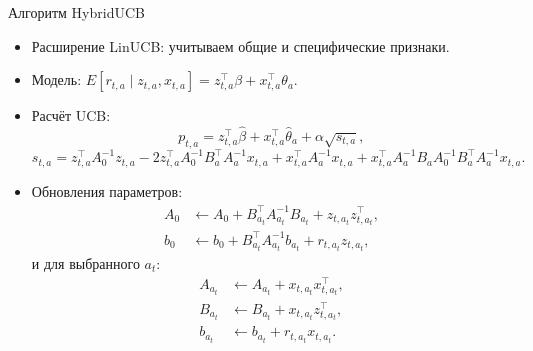 \documentclass[10pt]{beamer}
\begin{document}
\begin{frame}{Алгоритм HybridUCB}
  \begin{itemize}
    \item Расширение LinUCB: учитываем общие и специфические признаки.
    \item Модель: $E[r_{t,a}\mid z_{t,a},x_{t,a}] = z_{t,a}^\top\beta + x_{t,a}^\top\theta_a$.
    \item Расчёт UCB: 
    \[ p_{t,a} = z_{t,a}^\top\hat{\beta} + x_{t,a}^\top\hat{\theta}_a + \alpha\sqrt{s_{t,a}}, \]
    \[ s_{t,a} = z_{t,a}^\top A_0^{-1}z_{t,a} - 2z_{t,a}^\top A_0^{-1}B_a^\top A_a^{-1}x_{t,a} + x_{t,a}^\top A_a^{-1}x_{t,a} + x_{t,a}^\top A_a^{-1} B_a A_0^{-1} B_a^\top A_a^{-1} x_{t,a}. \]
    \item Обновления параметров:
    \begin{align*}
      A_0 &\leftarrow A_0 + B_{a_t}^\top A_{a_t}^{-1} B_{a_t} + z_{t,a_t}z_{t,a_t}^\top, \\
      b_0 &\leftarrow b_0 + B_{a_t}^\top A_{a_t}^{-1} b_{a_t} + r_{t,a_t}z_{t,a_t},
    \end{align*}
    и для выбранного $a_t$:
    \begin{align*}
      A_{a_t} &\leftarrow A_{a_t} + x_{t,a_t}x_{t,a_t}^\top, \\
      B_{a_t} &\leftarrow B_{a_t} + x_{t,a_t}z_{t,a_t}^\top, \\
      b_{a_t} &\leftarrow b_{a_t} + r_{t,a_t}x_{t,a_t}.
    \end{align*}
  \end{itemize}
\end{frame}
\end{document}
